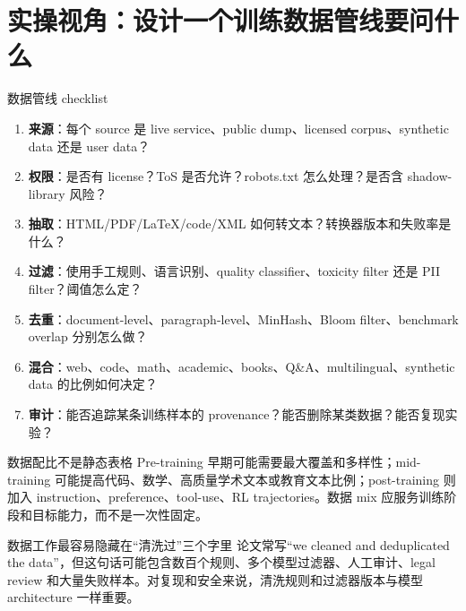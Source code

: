 \section{实操视角：设计一个训练数据管线要问什么}

\begin{importantbox}{数据管线 checklist}
\begin{enumerate}
    \item \textbf{来源}：每个 source 是 live service、public dump、licensed corpus、synthetic data 还是 user data？
    \item \textbf{权限}：是否有 license？ToS 是否允许？robots.txt 怎么处理？是否含 shadow-library 风险？
    \item \textbf{抽取}：HTML/PDF/LaTeX/code/XML 如何转文本？转换器版本和失败率是什么？
    \item \textbf{过滤}：使用手工规则、语言识别、quality classifier、toxicity filter 还是 PII filter？阈值怎么定？
    \item \textbf{去重}：document-level、paragraph-level、MinHash、Bloom filter、benchmark overlap 分别怎么做？
    \item \textbf{混合}：web、code、math、academic、books、Q\&A、multilingual、synthetic data 的比例如何决定？
    \item \textbf{审计}：能否追踪某条训练样本的 provenance？能否删除某类数据？能否复现实验？
\end{enumerate}
\end{importantbox}

\begin{knowledgebox}{数据配比不是静态表格}
Pre-training 早期可能需要最大覆盖和多样性；mid-training 可能提高代码、数学、高质量学术文本或教育文本比例；post-training 则加入 instruction、preference、tool-use、RL trajectories。数据 mix 应服务训练阶段和目标能力，而不是一次性固定。
\end{knowledgebox}

\begin{warningbox}{数据工作最容易隐藏在“清洗过”三个字里}
论文常写“we cleaned and deduplicated the data”，但这句话可能包含数百个规则、多个模型过滤器、人工审计、legal review 和大量失败样本。对复现和安全来说，清洗规则和过滤器版本与模型 architecture 一样重要。
\end{warningbox}

